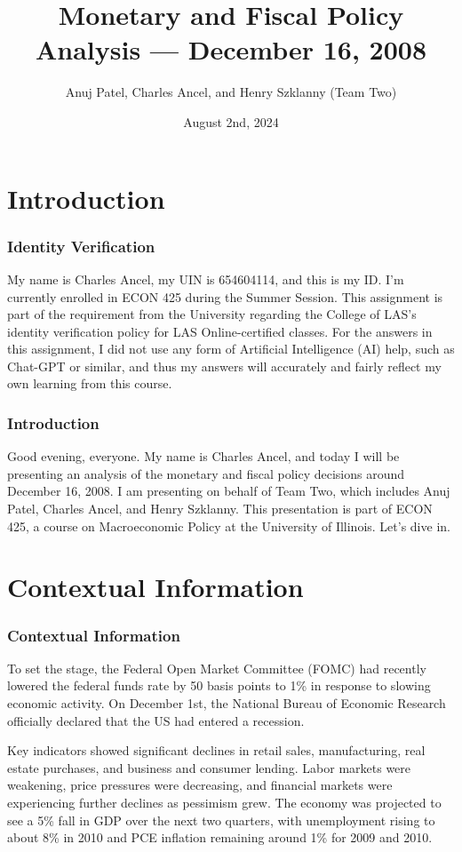 \documentclass{beamer}
\title{Monetary and Fiscal Policy Analysis --- December 16, 2008}
\author{Anuj Patel, Charles Ancel, and Henry Szklanny (Team Two)}
\date{August 2nd, 2024}
\begin{document}
\frame{\titlepage}

\section{Introduction}
\begin{frame}
    \frametitle{Identity Verification}
    My name is Charles Ancel, my UIN is 654604114, and this is my ID\@. I'm currently enrolled in ECON 425 during the Summer Session. This assignment is part of the requirement from the University regarding the College of LAS's identity verification policy for LAS Online-certified classes. For the answers in this assignment, I did not use any form of Artificial Intelligence (AI) help, such as Chat-GPT or similar, and thus my answers will accurately and fairly reflect my own learning from this course.
\end{frame}
\begin{frame}
    \frametitle{Introduction}
    Good evening, everyone. My name is Charles Ancel, and today I will be presenting an analysis of the monetary and fiscal policy decisions around December 16, 2008. I am presenting on behalf of Team Two, which includes Anuj Patel, Charles Ancel, and Henry Szklanny. This presentation is part of ECON 425, a course on Macroeconomic Policy at the University of Illinois. Let's dive in.
\end{frame}



\section{Contextual Information}
\begin{frame}
    \frametitle{Contextual Information}
    To set the stage, the Federal Open Market Committee (FOMC) had recently lowered the federal funds rate by 50 basis points to 1\% in response to slowing economic activity. On December 1st, the National Bureau of Economic Research officially declared that the US had entered a recession.
    \newline
    
    Key indicators showed significant declines in retail sales, manufacturing, real estate purchases, and business and consumer lending. Labor markets were weakening, price pressures were decreasing, and financial markets were experiencing further declines as pessimism grew. The economy was projected to see a 5\% fall in GDP over the next two quarters, with unemployment rising to about 8\% in 2010 and PCE inflation remaining around 1\% for 2009 and 2010.
\end{frame}
\end{document}
